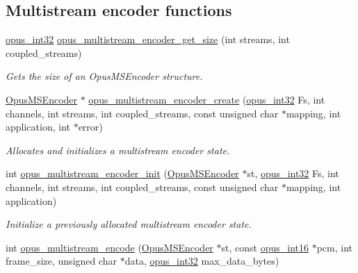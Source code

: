 \subsection*{Multistream encoder functions}
\label{_amgrp3d1c363464c5de793a99376ffb2fb267}
 \begin{DoxyCompactItemize}
\item 
\hyperlink{opus__types_8h_aa4d309d6f80b99dbabebc8f98879ab9a}{opus\_\-int32} \hyperlink{group__opus__multistream_ga8642aa9cf16115229a655574d832293b}{opus\_\-multistream\_\-encoder\_\-get\_\-size} (int streams, int coupled\_\-streams)
\begin{DoxyCompactList}\small\item\em Gets the size of an OpusMSEncoder structure. \item\end{DoxyCompactList}\item 
\hyperlink{group__opus__multistream_gae5826674d142fc873ebc1d781c507dd7}{OpusMSEncoder} $\ast$ \hyperlink{group__opus__multistream_gaeb64c648ed8155f824ca8d9a93ccecae}{opus\_\-multistream\_\-encoder\_\-create} (\hyperlink{opus__types_8h_aa4d309d6f80b99dbabebc8f98879ab9a}{opus\_\-int32} Fs, int channels, int streams, int coupled\_\-streams, const unsigned char $\ast$mapping, int application, int $\ast$error)
\begin{DoxyCompactList}\small\item\em Allocates and initializes a multistream encoder state. \item\end{DoxyCompactList}\item 
int \hyperlink{group__opus__multistream_gae7586aa54c322fd9599de24b5c8b8c01}{opus\_\-multistream\_\-encoder\_\-init} (\hyperlink{group__opus__multistream_gae5826674d142fc873ebc1d781c507dd7}{OpusMSEncoder} $\ast$st, \hyperlink{opus__types_8h_aa4d309d6f80b99dbabebc8f98879ab9a}{opus\_\-int32} Fs, int channels, int streams, int coupled\_\-streams, const unsigned char $\ast$mapping, int application)
\begin{DoxyCompactList}\small\item\em Initialize a previously allocated multistream encoder state. \item\end{DoxyCompactList}\item 
int \hyperlink{group__opus__multistream_ga9e1000f220d9872e9f3b6e4f2417b445}{opus\_\-multistream\_\-encode} (\hyperlink{group__opus__multistream_gae5826674d142fc873ebc1d781c507dd7}{OpusMSEncoder} $\ast$st, const \hyperlink{opus__types_8h_acc9ed7cf60479eb81f9648c6ec27dc26}{opus\_\-int16} $\ast$pcm, int frame\_\-size, unsigned char $\ast$data, \hyperlink{opus__types_8h_aa4d309d6f80b99dbabebc8f98879ab9a}{opus\_\-int32} max\_\-data\_\-bytes)

\end{DoxyCompactItemize}
